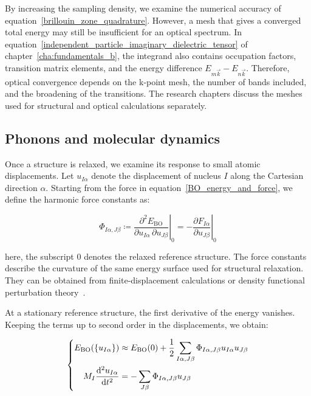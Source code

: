 By increasing the sampling density, we examine the numerical accuracy of equation~\eqref{brillouin_zone_quadrature}.
However, a mesh that gives a converged total energy may still be insufficient for an optical spectrum.
In equation~\eqref{independent_particle_imaginary_dielectric_tensor} of chapter~\ref{cha:fundamentals_b},
the integrand also contains occupation factors, transition matrix elements,
and the energy difference $E_{m\vec{k}}-E_{n\vec{k}}$.
Therefore, optical convergence depends on the k-point mesh, the number of bands included, and the broadening of the transitions.
The research chapters discuss the meshes used for structural and optical calculations separately.

\subsection{Phonons and molecular dynamics}
\label{subsec:method_stability}

Once a structure is relaxed, we examine its response to small atomic displacements.
Let $u_{I\alpha}$ denote the displacement of nucleus $I$ along the Cartesian direction $\alpha$.
Starting from the force in equation~\eqref{BO_energy_and_force},
we define the harmonic force constants as:

\begin{equation}
    \Phi_{I\alpha,J\beta}
    \coloneqq
    \left.\frac{\partial^2E_\mathrm{BO}}
    {\partial u_{I\alpha}\,\partial u_{J\beta}}\right|_0
    =
    -\left.\frac{\partial F_{I\alpha}}{\partial u_{J\beta}}\right|_0
\label{harmonic_force_constants_method}
\end{equation}

here, the subscript $0$ denotes the relaxed reference structure.
The force constants describe the curvature of the same energy surface used for structural relaxation.
They can be obtained from finite-displacement calculations or density functional perturbation theory~\cite{baroni2001phonons,togo2015first}.

At a stationary reference structure, the first derivative of the energy vanishes.
Keeping the terms up to second order in the displacements, we obtain:

\begin{equation}
\left\{\begin{aligned}
    E_\mathrm{BO}(\{u_{I\alpha}\})
    &\approx E_\mathrm{BO}(0)
    +\frac{1}{2}\sum_{I\alpha,J\beta}
    \Phi_{I\alpha,J\beta}u_{I\alpha}u_{J\beta} \\
    M_I\frac{\mathrm{d}^2u_{I\alpha}}{\mathrm{d} t^2}
    &=-\sum_{J\beta}\Phi_{I\alpha,J\beta}u_{J\beta}
\end{aligned}\right.
\label{harmonic_energy_and_motion_method}
\end{equation}

